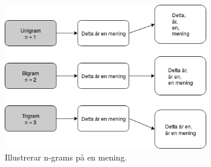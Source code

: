 \documentclass{kaumasters} %
\begin{document}
\begin{figure}[H]
\includegraphics[width=9cm]{grams}
\centering
\caption{Illustrerar n-grams på en mening.}
\label{fig:grams}
\end{figure}
\end{document}
